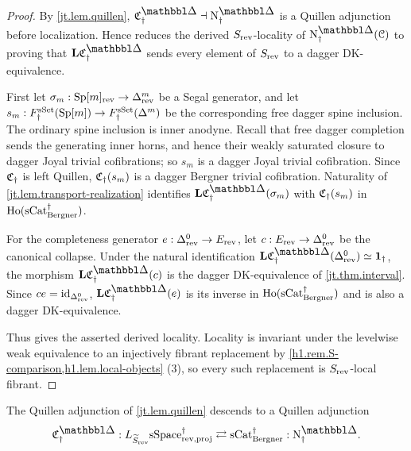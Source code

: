 \documentclass[a4paper,dvipdfmx,11pt]{amsart}
\begin{document}
\begin{proof}
  By \cref{jt.lem.quillen}, $\frakC^{\prism}_{\dag}\dashv\N^{\prism}_{\dag}$ is a Quillen adjunction before localization.
  Hence \cite[Theorem~3.1.6 (1)(a)--(c)]{Hir02} reduces the derived $S_{\mathrm{rev}}$-locality of $\N^{\prism}_{\dag}(\calC)$ to proving that $\bfL\frakC^{\prism}_{\dag}$ sends every element of $S_{\mathrm{rev}}$ to a dagger DK-equivalence.

  First let $\sigma_m:\mathrm{Sp}[m]_{\mathrm{rev}}\to\Delta^m_{\mathrm{rev}}$ be a Segal generator, and let $s_m:F_{\dag}^{\mathrm{sSet}}(\mathrm{Sp}[m])\to F_{\dag}^{\mathrm{sSet}}(\Delta^m)$ be the corresponding free dagger spine inclusion.
  The ordinary spine inclusion is inner anodyne.
  Recall that free dagger completion sends the generating inner horns, and hence their weakly saturated closure to dagger Joyal trivial cofibrations; 
  so $s_m$ is a dagger Joyal trivial cofibration.
  Since $\mathfrak{C}_{\dag}$ is left Quillen, $\mathfrak{C}_{\dag}(s_m)$ is a dagger Bergner trivial cofibration.
  Naturality of \cref{jt.lem.transport-realization} identifies $\bfL\frakC^{\prism}_{\dag}(\sigma_m)$ with $\mathfrak{C}_{\dag}(s_m)$ in $\mathrm{Ho}(\mathrm{sCat}^{\dag}_{\mathrm{Bergner}})$.

  For the completeness generator $e:\Delta^0_{\mathrm{rev}}\to E_{\mathrm{rev}}$, let $c:E_{\mathrm{rev}}\to\Delta^0_{\mathrm{rev}}$ be the canonical collapse.
  Under the natural identification $\bfL\frakC^{\prism}_{\dag}(\Delta^0_{\rev})\simeq\bfone_{\dag}$, the morphism $\bfL\frakC^{\prism}_{\dag}(c)$ is the dagger DK-equivalence of \cref{jt.thm.interval}.
  Since $ce=\operatorname{id}_{\Delta^0_{\mathrm{rev}}}$, $\bfL\frakC^{\prism}_{\dag}(e)$ is its inverse in $\mathrm{Ho}(\mathrm{sCat}^{\dag}_{\mathrm{Bergner}})$ and is also a dagger DK-equivalence.

  Thus \cite[Theorem~3.1.6 (1)]{Hir02} gives the asserted derived locality.
  Locality is invariant under the levelwise weak equivalence to an injectively fibrant replacement by \cref{h1.rem.S-comparison,h1.lem.local-objects} (3), so every such replacement is $S_{\mathrm{rev}}$-local fibrant.
\end{proof}

\begin{theorem}\label{jt.cor.localized-adjunction}
  The Quillen adjunction of \cref{jt.lem.quillen} descends to a Quillen adjunction
  \begin{align}
    \frakC^{\prism}_{\dag}:
    L_{\widetilde S_{\rev}}\sSpace^{\dag}_{\rev,\proj}
    \rightleftarrows
    \sCat^{\dag}_{\Bergner}:
    \N^{\prism}_{\dag}.
  \end{align}
\end{theorem}
\end{document}
